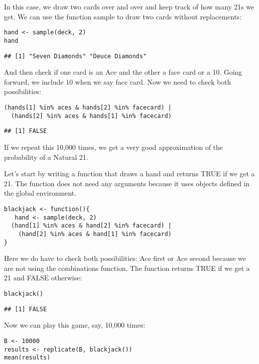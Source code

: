 \documentclass[
]{article}
\begin{document}
In this case, we draw two cards over and over and keep track of how many
21s we get. We can use the function sample to draw two cards without
replacements:

\begin{verbatim}
hand <- sample(deck, 2)
hand
\end{verbatim}

\begin{verbatim}
## [1] "Seven Diamonds" "Deuce Diamonds"
\end{verbatim}

And then check if one card is an Ace and the other a face card or a 10.
Going forward, we include 10 when we say face card. Now we need to check
both possibilities:

\begin{verbatim}
(hands[1] %in% aces & hands[2] %in% facecard) | 
  (hands[2] %in% aces & hands[1] %in% facecard)
\end{verbatim}

\begin{verbatim}
## [1] FALSE
\end{verbatim}

If we repeat this 10,000 times, we get a very good approximation of the
probability of a Natural 21.

Let's start by writing a function that draws a hand and returns TRUE if
we get a 21. The function does not need any arguments because it uses
objects defined in the global environment.

\begin{verbatim}
blackjack <- function(){
   hand <- sample(deck, 2)
  (hand[1] %in% aces & hand[2] %in% facecard) | 
    (hand[2] %in% aces & hand[1] %in% facecard)
}
\end{verbatim}

Here we do have to check both possibilities: Ace first or Ace second
because we are not using the combinations function. The function returns
TRUE if we get a 21 and FALSE otherwise:

\begin{verbatim}
blackjack()
\end{verbatim}

\begin{verbatim}
## [1] FALSE
\end{verbatim}

Now we can play this game, say, 10,000 times:

\begin{verbatim}
B <- 10000
results <- replicate(B, blackjack())
mean(results)
\end{verbatim}
\end{document}
